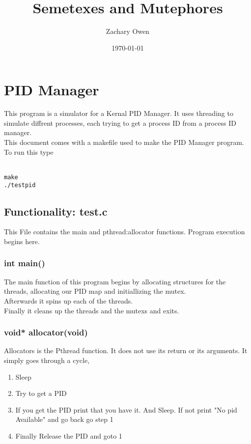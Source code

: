 \documentclass[11pt]{article}
\title{\textbf{ Semetexes and Mutephores}}
\author{Zachary Owen\\
		}
\date{ \today}
\begin{document}
\maketitle

\section{PID Manager}

This program is a simulator for a Kernal PID Manager. It uses threading to simulate diffrent processes, each trying to get a process ID from a process ID manager. \\

This document comes with a makefile used to make the PID Manager program. To run this type\\\\
\begin{verbatim}
make
./testpid
\end{verbatim}

\subsection{ Functionality: test.c}
This File contains the main and pthread:allocator functions. Program execution begins here.

\subsubsection{ int main() }
The main function of this program begins by allocating structures for the threads, allocating our PID map and initiallizing the mutex.\\

Afterwards it spins up each of the threads.\\

Finally it cleans up the threads and the mutexs and exits.

\subsubsection{ void* allocator(void)}
Allocators is the Pthread function. It does not use its return or its arguments. It simply goes through a cycle,
\begin{enumerate}
	\item Sleep
	\item Try to get a PID
	\item If you get the PID print that you have it. And Sleep.
	\subitem If not print "No pid Available" and go back go step 1
	\item Finally Release the PID and goto 1
\end{enumerate}
\end{document}
